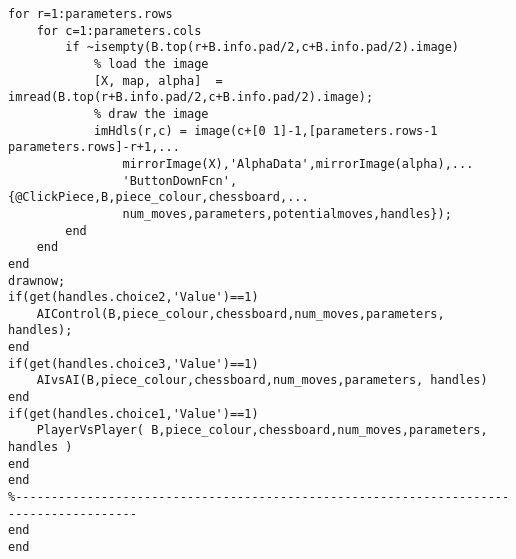 \documentclass{article}
\begin{document}
\begin{lstlisting}
for r=1:parameters.rows
    for c=1:parameters.cols
        if ~isempty(B.top(r+B.info.pad/2,c+B.info.pad/2).image)
            % load the image
            [X, map, alpha]  = imread(B.top(r+B.info.pad/2,c+B.info.pad/2).image);
            % draw the image
            imHdls(r,c) = image(c+[0 1]-1,[parameters.rows-1 parameters.rows]-r+1,...
                mirrorImage(X),'AlphaData',mirrorImage(alpha),...
                'ButtonDownFcn',{@ClickPiece,B,piece_colour,chessboard,...
                num_moves,parameters,potentialmoves,handles});
        end
    end
end
drawnow;
if(get(handles.choice2,'Value')==1)
    AIControl(B,piece_colour,chessboard,num_moves,parameters, handles);
end
if(get(handles.choice3,'Value')==1)
    AIvsAI(B,piece_colour,chessboard,num_moves,parameters, handles)
end
if(get(handles.choice1,'Value')==1)
    PlayerVsPlayer( B,piece_colour,chessboard,num_moves,parameters, handles )
end
end
%---------------------------------------------------------------------------------------
end
end
\end{lstlisting}
\end{document}
